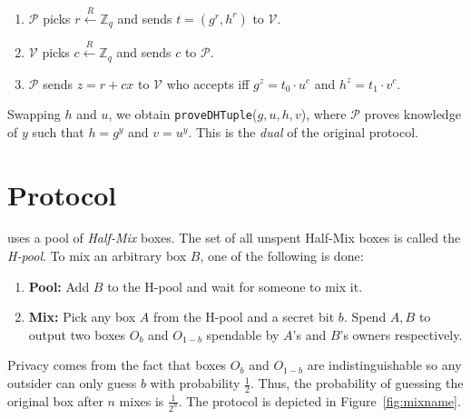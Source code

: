 \documentclass[runningheads]{llncs}
\begin{document}
\begin{enumerate}
	\item $\mathcal{P}$ picks $r \stackrel{R}{\leftarrow} \mathbb{Z}_q$ and sends $t = ({g}^r, {h}^r)$ to $\mathcal{V}$.
	\item $\mathcal{V}$ picks $c \stackrel{R}{\leftarrow} \mathbb{Z}_q$ and sends $c$ to $\mathcal{P}$.
	\item $\mathcal{P}$ sends $z = r + cx$ to $\mathcal{V}$ who accepts iff ${g}^z = {t_0}\cdot {u}^c$ and $h^z=t_1\cdot v^c$.
\end{enumerate}

Swapping $h$ and $u$, we obtain \texttt{proveDHTuple}($g, u, h, v$), where $\mathcal{P}$ proves knowledge of $y$ such that $h = g^y$ and $v = u^y$. This is the {\em dual} of the original protocol.


\section{\algname Protocol}

\algname uses a pool of {\em Half-Mix} boxes. The set of all unspent Half-Mix boxes is called the {\em H-pool}. To mix an arbitrary box $B$, one of the following is done:
\begin{enumerate}
	\item \textbf{Pool:} Add $B$ to the H-pool and wait for someone to mix it.
	\item \textbf{Mix:} Pick any box $A$ from the H-pool and a secret bit $b$. Spend $A, B$ to 
	output two boxes $O_b$ and $O_{1-b}$ spendable by $A$'s and $B$'s owners respectively.
\end{enumerate}

Privacy comes from the fact that boxes $O_b$ and $O_{1-b}$ are indistinguishable so any outsider can only guess $b$ with probability $\frac{1}{2}$. Thus, the probability of guessing the original box after $n$ mixes is $\frac{1}{2^n}$. The protocol is depicted in Figure~\ref{fig:mixname}. 
\end{document}
